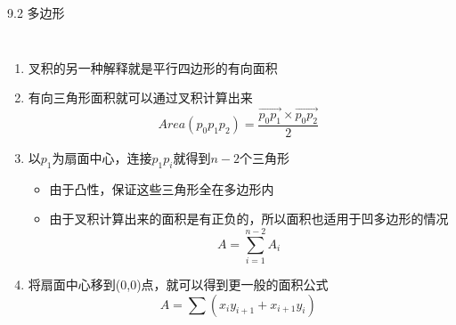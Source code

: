 \begin{frame}{9.2 多边形}
    \begin{columns}   
    \scriptsize{
    \begin{enumerate}[(1)]
        \item 叉积的另一种解释就是平行四边形的有向面积
        \item 有向三角形面积就可以通过叉积计算出来
        $$Area(p_0p_1p_2)=\frac{\overrightarrow{p_0p_1}\times \overrightarrow{p_0p_2}}{2}$$
        \item 以$p_1$为扇面中心，连接$p_1p_i$就得到$n-2$个三角形
        \begin{itemize}
            \item \scriptsize{由于凸性，保证这些三角形全在多边形内}
            \item \scriptsize{由于叉积计算出来的面积是有正负的，所以面积也适用于凹多边形的情况}
            $$A=\sum\limits_{i = 1}^{n-2}{A_i}$$
        \end{itemize}
        \item 将扇面中心移到(0,0)点，就可以得到更一般的面积公式
            $$A=\sum(x_iy_{i+1}+x_{i+1}y_i)$$
    \end{enumerate}}

\end{columns}
\end{frame}
